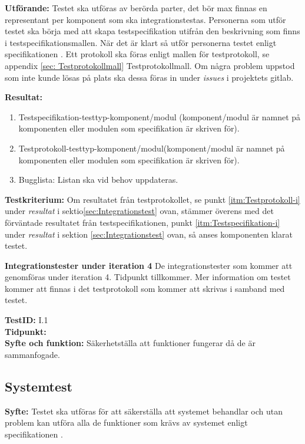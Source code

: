 \documentclass[a4paper,10pt, twoside]{article}
\begin{document}
\textbf{Utförande:}
Testet ska utföras av berörda parter, det bör max finnas en representant per komponent som ska integrationstestas. Personerna som utför testet ska börja med att skapa testspecifikation utifrån den beskrivning som finns i testspecifikationsmallen. När det är klart så utför personerna testet enligt specifikationen \cite{kravspec}. Ett protokoll ska föras enligt mallen för testprotokoll, se appendix \ref{sec: Testprotokollmall} Testprotokollmall. Om några problem uppstod som inte kunde lösas på plats ska dessa föras in under \emph{issues} i projektets gitlab.

\textbf{Resultat:}
\begin{enumerate}
	\item \label{itm:Testspecifikation-i} Testspecifikation-testtyp-komponent/modul (komponent/modul är namnet på 			 		  komponenten eller modulen som specifikation är skriven för).
    \item \label{itm:Testprotokoll-i} Testprotokoll-testtyp-komponent/modul(komponent/modul är namnet på komponenten eller 		  modulen som specifikation är skriven för).
    \item Bugglista: Listan ska vid behov uppdateras.
\end{enumerate}

\textbf{Testkriterium:}
Om resultatet från testprotokollet, se punkt \ref{itm:Testprotokoll-i} under \emph{resultat} i sektio\ref{sec:Integrationstest} ovan, stämmer överens med det förväntade resultatet från testspecifikationen, punkt \ref{itm:Testspecifikation-i} under \emph{resultat} i sektion \ref{sec:Integrationstest} ovan, så anses komponenten klarat testet.

\textbf{Integrationstester under iteration 4}
De integrationstester som kommer att genomföras under iteration 4. Tidpunkt tillkommer. Mer information om testet kommer att finnas i det testprotokoll som kommer att skrivas i samband med testet. 

\textbf{TestID:} I.1
\\ \textbf{Tidpunkt:}
\\ \textbf{Syfte och funktion:} Säkerhetställa att funktioner fungerar då de är sammanfogade.  


\subsection{Systemtest}
\label{sec:Systemtest}
\textbf{Syfte:} Testet ska utföras för att säkerställa att systemet behandlar och utan problem kan utföra alla de funktioner som krävs av systemet enligt specifikationen \cite{kravspec}.
\end{document}
